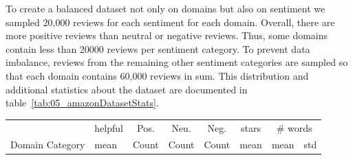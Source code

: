 To create a balanced dataset not only on domains but also on sentiment we sampled 20,000 reviews for each sentiment for each domain. Overall, there are more positive reviews than neutral or negative reviews. Thus, some domains contain less than 20000 reviews per sentiment category. To prevent data imbalance, reviews from the remaining other sentiment categories are sampled so that each domain contains 60,000 reviews in sum. This distribution and additional statistics about the dataset are documented in table~\ref{tab:05_amazonDatasetStats}.
\begin{table}    
    \begin{tabularx}{\textwidth}{lXrrrcrr}
        
        \toprule
        {} & helpful & \multicolumn{1}{c}{Pos.} & \multicolumn{1}{c}{Neu.} & \multicolumn{1}{c}{Neg.} &\multicolumn{1}{c}{stars} & \multicolumn{2}{c}{\# words} \\
        Domain Category &                             mean &       Count & Count & Count &  mean     &  mean  &     std \\


\end{tabularx}
\end{table}
